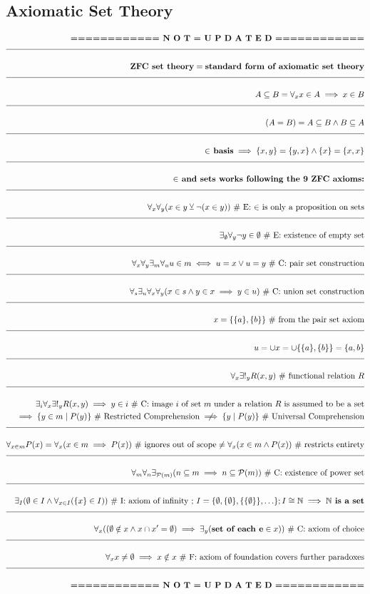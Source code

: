 \documentclass[a4paper]{article}
\def\ml{\mleft}
\def\mr{\mright}
\newcommand{\melazy}{\textbf{============ N O T = U P D A T E D ============}}
\newcommand{\eqComment}[1]{\text{  \# #1}}
\newcommand{\eqSep}{\text{ ;  }}
\newcommand{\n}{\\[1.5ex] \hline \nonumber \\[0ex]}
\newcommand{\m}{\nonumber \\}
\begin{document}
\subsection{Axiomatic Set Theory}
\begin{tcolorbox}
\begin{align}
   \melazy
\n \textbf{ZFC set theory} = \textbf{standard form of axiomatic set theory}
\n A \subseteq B = \forall_x x \in A \implies x \in B
\n \ml(A = B\mr) = A \subseteq B \land B \subseteq A
\n \textbf{$\in$ basis} \implies \{x, y\} = \{y, x\} \land \{x\} = \{x, x\}
\n \textbf{$\in$ and sets works following the 9 ZFC axioms:}
\n \forall_x \forall_y \ml(x \in y \veebar \lnot\ml(x \in y\mr)\mr) \eqComment{E: $\in$ is only a proposition on sets}
\n \exists_\emptyset \forall_y \lnot y \in \emptyset \eqComment{E: existence of empty set}
\n \forall_x \forall_y \exists_m \forall_u u \in m \iff u = x \lor u = y \eqComment{C: pair set construction}
\n \forall_s \exists_u \forall_x \forall_y \ml(x \in s \land y \in x \implies y \in u\mr) \eqComment{C: union set construction}
\n x = \{\{a\}, \{b\}\} \eqComment{from the pair set axiom}
\n u = \cup x = \cup \{\{a\}, \{b\}\} = \{a, b\}
\n \forall_x \exists!_y R\ml(x,y\mr) \eqComment{functional relation $R$}
\n \exists_i \forall_x \exists!_y R\ml(x,y\mr) \implies y \in i
\eqComment{C: image $i$ of set $m$ under a relation $R$ is assumed to be a set}
\m \implies \{y \in m \mid P\ml(y\mr)\} \eqComment{Restricted Comprehension} \centernot\implies  \{y \mid P\ml(y\mr)\} \eqComment{Universal Comprehension}
\n \forall_{x \in m} P\ml(x\mr) = \forall_x \ml(x \in m \implies P\ml(x\mr)\mr) \eqComment{ignores out of scope} \neq \forall_x \ml(x \in m \land P\ml(x\mr)\mr) \eqComment{restricts entirety}
\n \forall_m \forall_n \exists_{\mathcal{P}\ml(m\mr)} \ml(n \subseteq m \implies n \subseteq \mathcal{P}\ml(m\mr)\mr) \eqComment{C: existence of power set}
\n \exists_I \ml(\emptyset \in I \land \forall_{x \in I} \ml(\{x\} \in I\mr)\mr) \eqComment{I: axiom of infinity} \eqSep I = \{\emptyset, \{\emptyset\}, \{\{\emptyset\}\}, \ldots\} ; I \cong \mathbb{N} \implies \textbf{$\mathbb{N}$ is a set}
\n \forall_x \ml(\ml(\emptyset \notin x \land x \cap x' = \emptyset\mr) \implies \exists_y \ml(\textbf{set of each e} \in x\mr)\mr) \eqComment{C: axiom of choice}
\n \forall_x x \neq \emptyset \implies x \notin x \eqComment{F: axiom of foundation covers further paradoxes}
\n \melazy
\end{align}
\end{tcolorbox}
\end{document}
